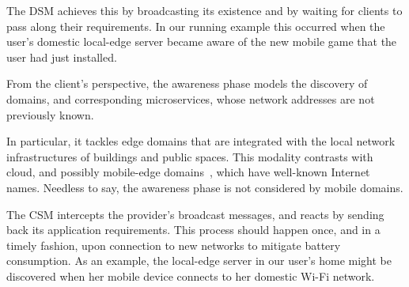 The DSM achieves this by broadcasting its existence and by waiting for clients to pass along their requirements. In our running example this occurred when the user's domestic local-edge server became aware of the new mobile game that the user had just installed. 



From the client's perspective, the awareness phase models the discovery of domains, and corresponding microservices, whose network addresses are not previously known. 

In particular, it tackles edge domains that are integrated with the local network infrastructures of buildings and public spaces. This modality contrasts with cloud, and possibly mobile-edge domains~\cite{ahmed2016isco}, which have well-known Internet names. Needless to say, the awareness phase is not considered by mobile domains.

The CSM intercepts the provider's broadcast messages, and reacts by sending back its application requirements. This process should happen once, and in a timely fashion, upon connection to new networks to mitigate battery consumption. As an example, the local-edge server in our user's home might be discovered when her mobile device connects to her domestic Wi-Fi network. 




